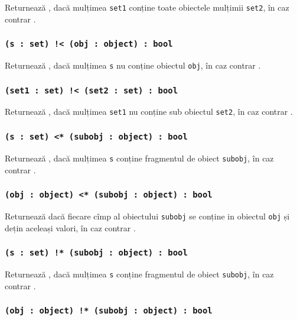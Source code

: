 Returnează \true, dacă mulțimea \texttt{set1} conține toate obiectele mulțimii \texttt{set2}, în caz contrar \false.

\subsubsection{\texttt{(s : set) !< (obj : object) : bool}}

Returnează \true{}, dacă mulțimea \texttt{s} nu conține obiectul \texttt{obj}, în caz contrar \false{}.

\subsubsection{\texttt{(set1 : set) !< (set2 : set) : bool}}

Returnează \true, dacă mulțimea \texttt{set1} nu conține sub obiectul \texttt{set2}, în caz contrar \false.

\subsubsection{\texttt{(s : set) <* (subobj : object) : bool}}

Returnează \true{}, dacă mulțimea \texttt{s} conține fragmentul de obiect \texttt{subobj}, în caz contrar \false{}.

\subsubsection{\texttt{(obj : object) <* (subobj : object) : bool}}

Returnează \true{} dacă fiecare cîmp al obiectului \texttt{subobj} se conține in obiectul \texttt{obj} și dețin aceleași valori, în caz contrar \false{}.

\subsubsection{\texttt{(s : set) !* (subobj : object) : bool}}

Returnează \false{}, dacă mulțimea \texttt{s} conține fragmentul de obiect \texttt{subobj}, în caz contrar \true{}.

\subsubsection{\texttt{(obj : object) !* (subobj : object) : bool}}

